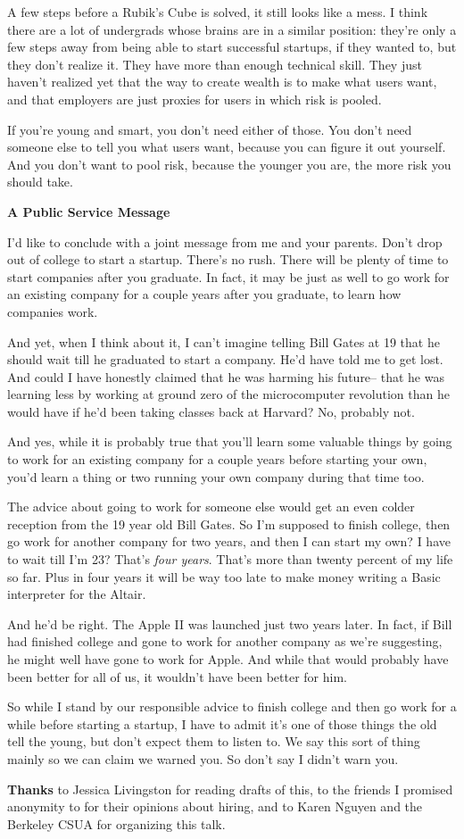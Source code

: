 A few steps before a Rubik's Cube is solved, it still looks like a mess.
I think there are a lot of undergrads whose brains are in a similar
position: they're only a few steps away from being able to start
successful startups, if they wanted to, but they don't realize it. They
have more than enough technical skill. They just haven't realized yet
that the way to create wealth is to make what users want, and that
employers are just proxies for users in which risk is pooled.

If you're young and smart, you don't need either of those. You don't
need someone else to tell you what users want, because you can figure it
out yourself. And you don't want to pool risk, because the younger you
are, the more risk you should take.

\textbf{A Public Service Message}

I'd like to conclude with a joint message from me and your parents.
Don't drop out of college to start a startup. There's no rush. There
will be plenty of time to start companies after you graduate. In fact,
it may be just as well to go work for an existing company for a couple
years after you graduate, to learn how companies work.

And yet, when I think about it, I can't imagine telling Bill Gates at 19
that he should wait till he graduated to start a company. He'd have told
me to get lost. And could I have honestly claimed that he was harming
his future-- that he was learning less by working at ground zero of the
microcomputer revolution than he would have if he'd been taking classes
back at Harvard? No, probably not.

And yes, while it is probably true that you'll learn some valuable
things by going to work for an existing company for a couple years
before starting your own, you'd learn a thing or two running your own
company during that time too.

The advice about going to work for someone else would get an even colder
reception from the 19 year old Bill Gates. So I'm supposed to finish
college, then go work for another company for two years, and then I can
start my own? I have to wait till I'm 23? That's \emph{four years}.
That's more than twenty percent of my life so far. Plus in four years it
will be way too late to make money writing a Basic interpreter for the
Altair.

And he'd be right. The Apple II was launched just two years later. In
fact, if Bill had finished college and gone to work for another company
as we're suggesting, he might well have gone to work for Apple. And
while that would probably have been better for all of us, it wouldn't
have been better for him.

So while I stand by our responsible advice to finish college and then go
work for a while before starting a startup, I have to admit it's one of
those things the old tell the young, but don't expect them to listen to.
We say this sort of thing mainly so we can claim we warned you. So don't
say I didn't warn you.


\textbf{Thanks} to Jessica Livingston for reading drafts of this, to the
friends I promised anonymity to for their opinions about hiring, and to
Karen Nguyen and the Berkeley CSUA for organizing this talk.